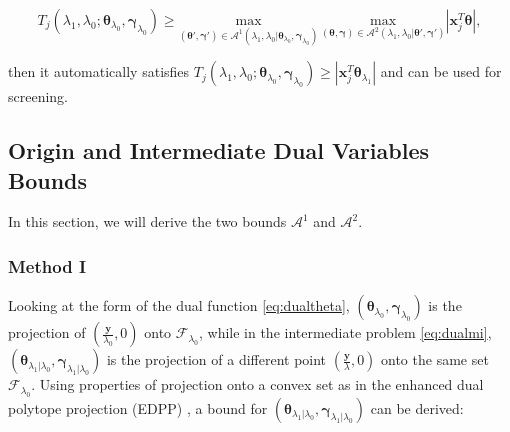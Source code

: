\begin{equation}
    \label{eq:boundbound}
    T_j(\lambda_{1},\lambda_{0};\boldsymbol\theta_{\lambda_0},\boldsymbol\gamma_{\lambda_0})\geq \underset{(\boldsymbol\theta',\boldsymbol\gamma')\in\mathcal{A}^1(\lambda_1,\lambda_0|\boldsymbol\theta_{\lambda_0},\boldsymbol\gamma_{\lambda_0})}{\mathrm{max}}\,\underset{(\boldsymbol\theta,\boldsymbol\gamma)\in\mathcal{A}^2(\lambda_1,\lambda_0|\boldsymbol\theta',\boldsymbol\gamma')}{\mathrm{max}}|\boldsymbol x_j^T\boldsymbol\theta|,
\end{equation}

then it automatically satisfies $T_j(\lambda_{1},\lambda_{0};\boldsymbol\theta_{\lambda_0},\boldsymbol\gamma_{\lambda_0})\geq |\boldsymbol x_j^T\boldsymbol\theta_{\lambda_1}|$ and can be used for screening.

\subsection{Origin and Intermediate Dual Variables Bounds}

In this section, we will derive the two bounds $\mathcal{A}^1$ and $\mathcal{A}^2$.

\subsubsection{Method I}

Looking at the form of the dual function \eqref{eq:dualtheta}, $(\boldsymbol\theta_{\lambda_0},\boldsymbol\gamma_{\lambda_0})$ is the projection of $(\frac{\boldsymbol y}{\lambda_0},0)$ onto $\mathcal{F}_{\lambda_0}$, while in the intermediate problem \eqref{eq:dualmi}, $(\boldsymbol\theta_{\lambda_1|\lambda_0},\boldsymbol\gamma_{\lambda_1|\lambda_0})$ is the projection of a different point $(\frac{\boldsymbol y}{\lambda},0)$ onto the same set $\mathcal{F}_{\lambda_0}$. Using properties of projection onto a convex set as in the enhanced dual polytope projection (EDPP) \citep{wang2013lasso}, a bound for $(\boldsymbol\theta_{\lambda_1|\lambda_0},\boldsymbol\gamma_{\lambda_1|\lambda_0})$ can be derived:

